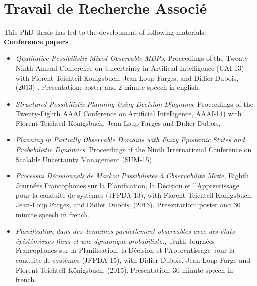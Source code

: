 \chapter*{Travail de Recherche Associ\'e}

This PhD thesis has led to the development of following materials:\\

\textbf{Conference papers}
\begin{itemize}
\item \textit{Qualitative {P}ossibilistic {M}ixed-{O}bservable {MDP}s}, 
Proceedings of the Twenty-Ninth Annual Conference on Uncertainty in Artificial Intelligence (UAI-13) 
with Florent Teichteil-Konigsbuch, Jean-Loup Farges, and Didier Dubois, (2013) \cite{Drougard13}. Presentation: poster and $2$ minute speech in english.
\item \textit{Structured Possibilistic Planning Using Decision Diagrams}, 
Proceedings of the Twenty-Eighth {AAAI} Conference on Artificial Intelligence,
AAAI-14) with Florent Teichteil{-}K{\"{o}}nigsbuch, Jean-Loup Farges and Didier Dubois,
\item \textit{Planning in Partially Observable Domains with Fuzzy Epistemic States and Probabilistic Dynamics},
Proceedings of the Ninth International Conference on Scalable Uncertainty Management (SUM-15)
\item \textit{Processus D\'ecisionnels de Markov Possibilistes \`a Observabilit\'e Mixte},
Eighth Journ\'ees Francophones sur la Planification, la D\'ecision et l'Apprentissage pour la conduite de syst\`emes (JFPDA-13),
with Florent Teichteil-Konigsbuch, Jean-Loup Farges, and Didier Dubois, (2013). Presentation: poster and $30$ minute speech in french.
\item \textit{Planification dans des domaines partiellement
observables avec des \'etats \'epist\'emiques flous
et une dynamique probabiliste.},
Tenth Journ\'ees Francophones sur la Planification, la D\'ecision et l'Apprentissage pour la conduite de syst\`emes (JFPDA-15),
with Didier Dubois, Jean-Loup Farge and Florent Teichteil-K\"onigsbuch, (2015). Presentation: $30$ minute speech in french.
\end{itemize}

